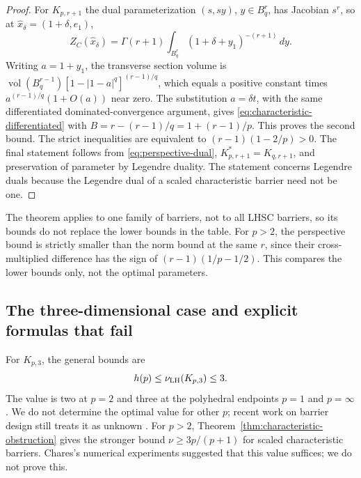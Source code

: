 \begin{proof}
For $K_{p,r+1}$ the dual parameterization $(s,sy)$, $y\in B_q^r$,
has Jacobian $s^r$, so at $\widehat x_\delta=(1+\delta,e_1)$,
\[
 Z_C(\widehat x_\delta)
 =\Gamma(r+1)\int_{B_q^r}(1+\delta+y_1)^{-(r+1)}\,dy.
\]
Writing $a=1+y_1$, the transverse section volume is
$\operatorname{vol}(B_q^{r-1})[1-|1-a|^q]^{(r-1)/q}$,
which equals a positive constant times
$a^{(r-1)/q}(1+O(a))$ near zero. The substitution $a=\delta t$,
with the same differentiated dominated-convergence argument, gives
\eqref{eq:characteristic-differentiated} with
$B=r-(r-1)/q=1+(r-1)/p$. This proves the second bound.
The strict inequalities are equivalent to $(r-1)(1-2/p)>0$.
The final statement follows from \eqref{eq:perspective-dual},
$K_{p,r+1}^*=K_{q,r+1}$, and preservation of parameter by Legendre
duality. The statement concerns Legendre duals because the Legendre
dual of a scaled characteristic barrier need not be one.
\end{proof}

The theorem applies to one family of barriers, not to all LHSC barriers,
so its bounds do not replace the lower bounds in the table.
For $p>2$, the perspective bound is strictly smaller than the norm bound
at the same $r$, since their cross-multiplied difference has the sign
of $(r-1)(1/p-1/2)$. This compares the lower bounds only, not the
optimal parameters.

\subsection{The three-dimensional case and explicit formulas that fail}
For $K_{p,3}$, the general bounds are
\begin{equation}\label{eq:three-dimensional-interval}
 h(p)\leq\nu_{\rm LH}(K_{p,3})\leq3.
\end{equation}
The value is two at $p=2$ and three at the polyhedral endpoints $p=1$
and $p=\infty$ \citep{Hildebrand2013}. We do not determine the optimal
value for other $p$; recent work on barrier design still treats it
as unknown \citep{PirauHildebrand2026}.
For $p>2$, Theorem~\ref{thm:characteristic-obstruction} gives the
stronger bound $\nu\geq3p/(p+1)$ for scaled characteristic barriers.
Chares's numerical experiments suggested that this value suffices; we
do not prove this.

